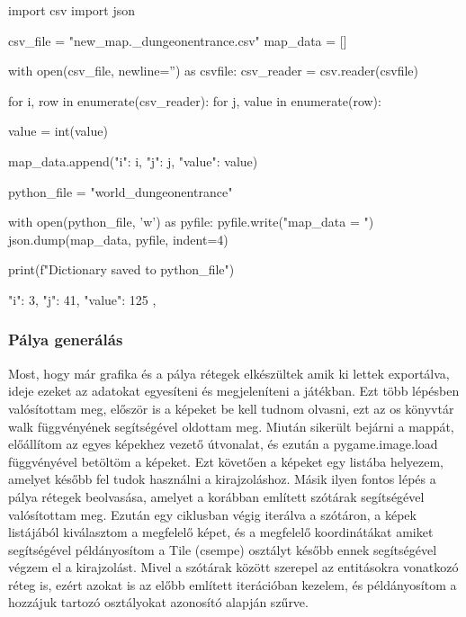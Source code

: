 \begin{python}[caption={csvtodict},label=py:csvtodict]
    import csv
    import json
    
    csv_file = "new_map\MSmap._dungeonentrance.csv"
    map_data = []
    
    with open(csv_file, newline='') as csvfile:
        csv_reader = csv.reader(csvfile)
    
        for i, row in enumerate(csv_reader):
            for j, value in enumerate(row):
    
                value = int(value)
    
                    map_data.append({"i": i, "j": j, "value": value})
    
    python_file = "world_dungeonentrance"
    
    with open(python_file, 'w') as pyfile:
        pyfile.write("map_data = ")
        json.dump(map_data, pyfile, indent=4)
    
    print(f"Dictionary saved to {python_file}")
    
\end{python}


\begin{python}[caption={Minta az átalakított struktúrára}, label=py:átalakított struktúra]
    {
        "i": 3,
        "j": 41,
        "value": 125
    },
\end{python}


\subsubsection{Pálya generálás}

Most, hogy már grafika és a pálya rétegek elkészültek amik ki lettek exportálva, ideje ezeket az adatokat egyesíteni és megjeleníteni a játékban. Ezt több lépésben valósítottam meg, először is a képeket be kell tudnom olvasni, ezt az os könyvtár walk függvényének segítségével oldottam meg. Miután sikerült bejárni a mappát, előállítom az egyes képekhez vezető útvonalat, és ezután a pygame.image.load függvényével betöltöm a képeket. Ezt követően a képeket egy listába helyezem, amelyet később fel tudok használni a kirajzoláshoz. Másik ilyen fontos lépés a pálya rétegek beolvasása, amelyet a korábban említett szótárak segítségével valósítottam meg. Ezután egy ciklusban végig iterálva a szótáron, a képek listájából kiválasztom a megfelelő képet, és a megfelelő koordinátákat amiket segítségével példányosítom a Tile (csempe) osztályt később ennek segítségével végzem el a kirajzolást. Mivel a szótárak között szerepel az entitásokra vonatkozó réteg is, ezért azokat is az előbb említett iterációban kezelem, és példányosítom a hozzájuk tartozó osztályokat azonosító alapján szűrve.

